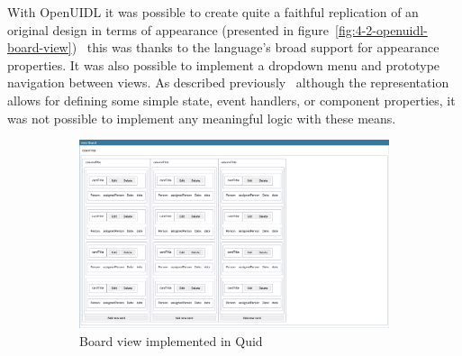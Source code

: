 With OpenUIDL it was possible to create quite a faithful replication of an original design in terms of appearance (presented in figure~\ref{fig:4-2-openuidl-board-view}) \textendash\ this was thanks to the language's broad support for appearance properties.
It was also possible to implement a dropdown menu and prototype navigation between views.
As described previously \textendash\ although the representation allows for defining some simple state, event handlers, or component properties, it was not possible to implement any meaningful logic with these means.


\begin{figure}
    \centering
    \begin{subfigure}[m]{0.5\textwidth}
        \centering
        \includegraphics[height=0.2\textheight]{./4-results-and-discussion/quid-board-view}
        \caption{Board view implemented in Quid}
        \label{fig:4-2-quid-board-view}
    \end{subfigure}
    \hfill
    \begin{subfigure}[m]{0.35\textwidth}
        \centering

\end{subfigure}
\end{figure}
